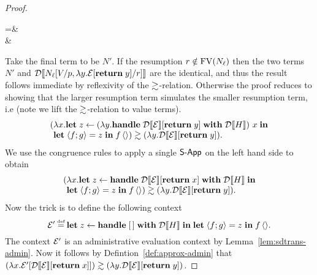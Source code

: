 \documentclass[12pt,phd,lfcs,twoside,openright,logo,leftchapter,normalheadings]{infthesis}
\theoremstyle{plain}
\theoremstyle{definition}
\begin{document}
\begin{proof}
\begin{derivation}
  =& \\
   &
             \el
  \end{derivation}
  Take the final term to be $N'$. If the resumption
  $r \notin \mathrm{FV}(N_\ell)$ then the two terms $N'$ and
  $\mathcal{D}\llbracket N_\ell[V/p,\lambda y.\mathcal{E}[\mathbf{return}\;y]/r] \rrbracket$ are the
  identical, and thus the result follows immediate by reflexivity of
  the $\gtrsim$-relation. Otherwise the proof reduces to showing that
  the larger resumption term simulates the smaller resumption term,
  i.e (note we lift the $\gtrsim$-relation to value terms).
  \[
    (\bl
     \lambda x.\Let\;z \revto (\lambda y.\Handle\;\sdtrans{\EC}[\Return\;y]\;\With\;\sdtrans{H})~x\;\In\\
    \Let\;\Record{f;g} = z \;\In\;f\,\Unit) \approxa (\lambda y.\sdtrans{\EC}[\Return\;y]).
    \el
  \]
  We use the congruence rules to apply a single $\mathsf{S\textrm{-}App}$ on the
  left hand side to obtain
  \[
    (\bl
     \lambda x.\Let\;z \revto \Handle\;\sdtrans{\EC}[\Return\;x]\;\With\;\sdtrans{H}\;\In\\
    \Let\;\Record{f;g} = z \;\In\;f\,\Unit) \approxa (\lambda y.\sdtrans{\EC}[\Return\;y]).
    \el
  \]
  Now the trick is to define the following context
  \[
    \EC' \defas \Let\;z \revto \Handle\; [\,]\;\With\;\sdtrans{H}\;\In\;\Let\;\Record{f;g} = z \;\In\;f\,\Unit.
  \]
  The context $\mathcal{E}'$ is an administrative evaluation context by
  Lemma~\ref{lem:sdtrans-admin}. Now it follows by
  Defintion~\ref{def:approx-admin} that
  $(\lambda x.\mathcal{E}'[\mathcal{D}\llbracket \mathcal{E} \rrbracket[\mathbf{return}\;x]]) \gtrsim
  (\lambda y.\mathcal{D}\llbracket \mathcal{E} \rrbracket[\mathbf{return}\;y])$.

\end{proof}
\end{document}
